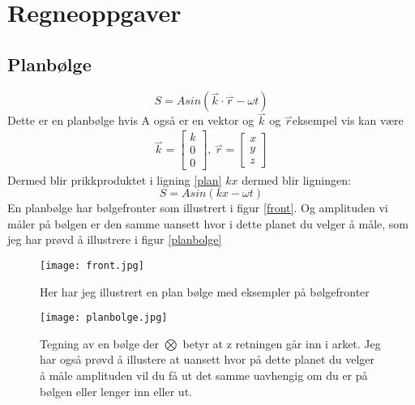 \documentclass[a4paper,12pt,norsk]{article}
\newcommand{\ov}{\overset}
\begin{document}
\section{Regneoppgaver}

\subsection{Planbølge}
\begin{equation}
S = Asin(\ov{\rightharpoonup}{k} \cdot \ov{\rightharpoonup}{r}-\omega t)
\label{plan}
\end{equation}
Dette er en planbølge hvis A også er en vektor og $\ov{\rightharpoonup}{k}$ og $\ov{\rightharpoonup}{r}$eksempel vis kan være 
\begin{align*}
\ov{\rightharpoonup}{k} = \left[
	\begin{matrix}
	k\\0\\0
	\end{matrix} \right] \text{, }
\ov{\rightharpoonup}{r} = \left [
	\begin{matrix}
	x\\y\\z
	\end{matrix} \right] 
\end{align*}
Dermed blir prikkproduktet i ligning \ref{plan} $kx$ dermed blir ligningen:
$$
S = Asin(kx-\omega t)
$$
En planbølge har bølgefronter som illustrert i figur \vref{front}. Og amplituden vi måler på bølgen er den samme uansett hvor i dette planet du velger å måle, som jeg har prøvd å illustrere i figur \vref{planbolge}

\begin{figure}
	\begin{minipage}{0.5\linewidth}
	\texttt{[image: front.jpg]} 
	\caption[Bølgefront]{Her har jeg illustrert en plan bølge med eksempler på bølgefronter}
	\label{front}
	\end{minipage}
	\hspace{.5cm}
	\begin{minipage}{0.5\linewidth}
	\texttt{[image: planbolge.jpg]} 
	\caption[Planbølge]{Tegning av en bølge der $\bigotimes$ betyr at z retningen går inn i arket. Jeg har også prøvd å illustere at uansett hvor på dette planet du velger å måle amplituden vil du få ut det samme uavhengig om du er på bølgen eller lenger inn eller ut.}
	\label{planbolge}
	\end{minipage}
\end{figure}
\end{document}
